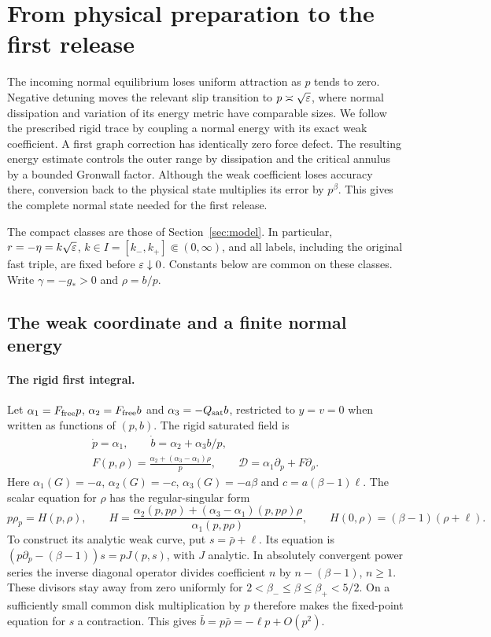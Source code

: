 \section{From physical preparation to the first release}
\label{sec:entry}
The incoming normal equilibrium loses uniform attraction as $p$ tends
to zero. Negative detuning moves the relevant slip transition to
$p\asymp\sqrt{\varepsilon}$, where normal dissipation and variation of its
energy metric have comparable sizes. We follow the prescribed rigid
trace by coupling a normal energy with its exact weak coefficient.
A first graph correction has identically zero force defect. The
resulting energy estimate controls the outer range by dissipation and
the critical annulus by a bounded Gronwall factor. Although the weak
coefficient loses accuracy there, conversion back to the physical
state multiplies its error by $p^\beta$. This gives the complete
normal state needed for the first release.

The compact classes are those of Section~\ref{sec:model}. In particular,
$r=-\eta=k\sqrt{\varepsilon}$, $k\in I=[k_-,k_+]\Subset(0,\infty)$,
and all labels, including the original fast triple, are fixed before
$\varepsilon\downarrow0$. Constants below are common on these classes.
Write $\gamma=-g_*>0$ and $\rho=b/p$.

\subsection{The weak coordinate and a finite normal energy}

\paragraph{The rigid first integral.}
Let $\alpha_1=F_{\rm free}p$, $\alpha_2=F_{\rm free}b$ and
$\alpha_3=-Q_{\rm sat}b$, restricted to $y=v=0$ when written as
functions of $(p,b)$. The rigid saturated field is
\begin{equation}
 \begin{gathered}
 \dot p=\alpha_1,\qquad \dot b=\alpha_2+\alpha_3b/p,\\
 F(p,\rho)=\frac{\alpha_2+(\alpha_3-\alpha_1)\rho}{p},\qquad
 \mathscr D=\alpha_1\partial_p+F\partial_\rho.
 \end{gathered}
 \label{ent:rigid-field}
\end{equation}
Here $\alpha_1(G)=-a$, $\alpha_2(G)=-c$,
$\alpha_3(G)=-a\beta$ and $c=a(\beta-1)\ell$.
The scalar equation for $\rho$ has the regular-singular form
\[
 p\rho_p=H(p,\rho),\qquad
 H=\frac{\alpha_2(p,p\rho)+(\alpha_3-\alpha_1)(p,p\rho)\rho}
              {\alpha_1(p,p\rho)},\qquad
 H(0,\rho)=(\beta-1)(\rho+\ell).
\]
To construct its analytic weak curve, put $s=\bar\rho+\ell$.
Its equation is $(p\partial_p-(\beta-1))s=pJ(p,s)$, with $J$
analytic. In absolutely convergent power series the inverse diagonal
operator divides coefficient $n$ by $n-(\beta-1)$, $n\ge1$.
These divisors stay away from zero uniformly for
$2<\beta_-\le\beta\le\beta_+<5/2$. On a sufficiently small common
disk multiplication by $p$ therefore makes the fixed-point equation
for $s$ a contraction. This gives $\bar b=p\bar\rho=-\ell p+O(p^2)$.

